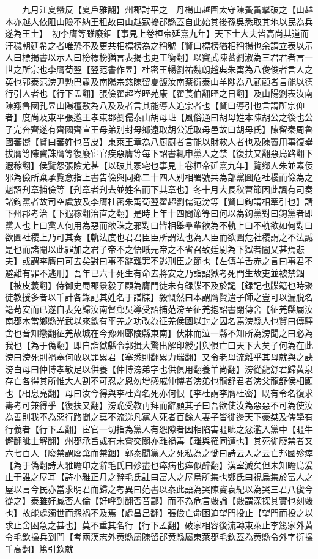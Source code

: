 　　九月江夏蠻反【夏戶雅翻】州郡討平之　丹楊山越圍太守陳夤夤擊破之【山越本亦越人依阻山險不納王租故曰山越寇擾郡縣蓋自此始其後孫吳悉取其地以民為兵遂為王土】　初李膺等雖廢錮【事見上卷桓帝延熹九年】天下士大夫皆高尚其道而汙穢朝廷希之者唯恐不及更共相標榜為之稱號【賢曰標榜猶相稱揚也余謂立表以示人曰標揭書以示人曰榜標榜猶言表揭也更工衡翻】以竇武陳蕃劉淑為三君君者言一世之所宗也李膺荀翌【翌范書作昱】杜密王暢劉祐魏朗趙典朱㝢為八俊俊者言人之英也郭泰范滂尹勲巴肅及南陽宗慈陳留夏馥汝南蔡衍泰山羊陟為八顧顧者言能以德行引人者也【行下孟翻】張儉翟超岑晊苑康【翟萇伯翻晊之日翻】及山陽劉表汝南陳翔魯國孔昱山陽檀敷為八及及者言其能導人追宗者也【賢曰導引也言謂所宗仰者】度尚及東平張邈王孝東郡劉儒泰山胡母班【風俗通曰胡母姓本陳胡公之後也公子完奔齊遂有齊國齊宣王母弟别封母鄉遠取胡公近取母邑故曰胡母氏】陳留秦周魯國蕃嚮【賢曰蕃姓也音皮】東萊王章為八厨厨者言能以財救人者也及陳竇用事復舉拔膺等陳竇誅膺等復廢宦官疾惡膺等每下詔書輒申黨人之禁【復扶又翻惡烏路翻下遐稼翻】侯覽怨張險尤甚【以破其冢宅也事見上卷桓帝延熹九年】覽鄉人朱並素佞邪為儉所棄承覽意指上書告儉與同鄉二十四人别相署號共為部黨圖危社稷而儉為之魁詔刋章捕儉等【刋章者刋去並姓名而下其章也】冬十月大長秋曹節因此諷有司奏諸鉤黨者故司空虞放及李膺杜密朱㝢荀翌翟超劉儒范滂等【賢曰鉤謂相牽引也】請下州郡考治【下遐稼翻治直之翻】是時上年十四問節等曰何以為鉤黨對曰鉤黨者即黨人也上曰黨人何用為惡而欲誅之邪對曰皆相舉羣輩欲為不軌上曰不軌欲如何對曰欲圖社稷上乃可其奏【軌法度也君君臣臣所謂法也為人臣而欲圖危社稷謂之不法誠是也而諸閹以此罪加之君子帝不之悟眂元帝之不省召致廷尉為下獄者闇乂甚焉悲夫】或謂李膺曰可去矣對曰事不辭難罪不逃刑臣之節也【左傳羊舌赤之言曰事君不避難有罪不逃刑】吾年已六十死生有命去將安之乃詣詔獄考死門生故吏並被禁錮【被皮義翻】侍御史蜀郡景毅子顧為膺門徒未有録牒不及於譴【録記也牒籍也時聚徒教授多者以千計各錄記其姓名于譜牒】毅慨然曰本謂膺賢遣子師之豈可以漏脱名籍苟安而已遂自表免歸汝南督郵吳導受詔捕范滂至征羌抱詔書閉傳舍【征羌縣屬汝南郡木當鄉縣光武以來歙有平羌之功改為征羌侯國以封之因名焉滂縣人也賢曰傳驛舍也音知戀翻征羌故城在今豫州郾陵縣東南】伏牀而泣一縣不知所為滂聞之曰必為我也【為于偽翻】即自詣獄縣令郭揖大驚出解印綬引與俱亡曰天下大矣子何為在此滂曰滂死則禍塞何敢以罪累君【塞悉則翻累力瑞翻】又令老母流離乎其母就與之訣滂白母曰仲博孝敬足以供養【仲博滂弟字也供俱用翻養羊尚翻】滂從龍舒君歸黄泉存亡各得其所惟大人割不可忍之恩勿增感戚仲博者滂弟也龍舒君者滂父龍舒侯相顯也【相息亮翻】母曰汝今得與李杜齊名死亦何恨【李杜謂李膺杜密】既有令名復求夀考可兼得乎【復扶又翻】滂跪受教再拜而辭顧其子曰吾欲使汝為惡惡不可為使汝為善則我不為惡行路聞之莫不流涕凡黨人死者百餘人妻子皆徙邊天下豪桀及儒學有行義者【行下孟翻】宦官一切指為黨人有怨隙者因相陷害睚眦之忿濫入黨中【睚牛懈翻眦士解翻】州郡承旨或有未嘗交關亦離禍毒【離與罹同遭也】其死徙廢禁者又六七百人【廢禁謂廢棄而禁錮】郭泰聞黨人之死私為之慟曰詩云人之云亡邦國殄瘁【為于偽翻詩大雅瞻卬之辭毛氏曰殄盡也瘁病也瘁似醉翻】漢室滅矣但未知瞻烏爰止于誰之屋耳【詩小雅正月之辭毛氏註曰富人之屋烏所集也鄭氏曰視烏集於富人之屋以言今民亦當求明君而歸之考異曰范書以泰此語為哭陳竇袁紀以為哭三君八俊今從之】泰雖好臧否人倫【好呼到翻否音鄙】而不為危言覈論【覈謂深探其實也刻覈也】故能處濁世而怨禍不及焉【處昌呂翻】張儉亡命困迫望門投止【望門而投之以求止舍困急之甚也】莫不重其名行【行下孟翻】破家相容後流轉東萊止李篤家外黄令毛欽操兵到門【考兩漢志外黄縣屬陳留郡黄縣屬東萊郡毛欽蓋為黄縣令外字衍操千高翻】篤引欽就